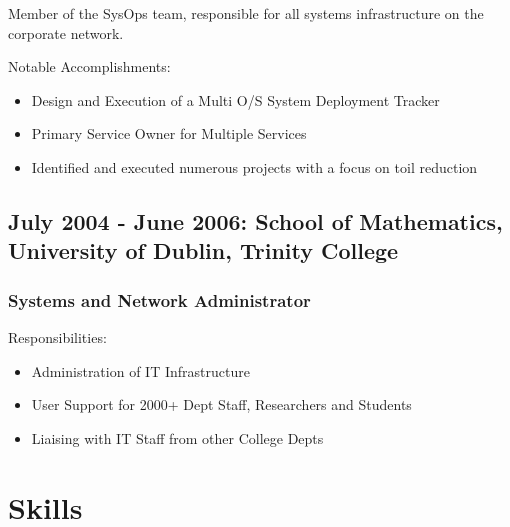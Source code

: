 \documentclass[a4paper, 10pt] {article}
\begin{document}
Member of the SysOps team, responsible for all systems infrastructure on the corporate network.

\vspace{5mm} %

Notable Accomplishments:

\begin{itemize}
  \item Design and Execution of a Multi O/S System Deployment Tracker
  \item Primary Service Owner for Multiple Services
  \item Identified and executed numerous projects with a focus on toil reduction
\end{itemize}

\subsection*{July 2004 - June 2006: School of Mathematics, University of Dublin, Trinity College}

\subsubsection*{Systems and Network Administrator}

Responsibilities:

\begin{itemize}
  \item Administration of IT Infrastructure
  \item User Support for 2000+ Dept Staff, Researchers and Students
  \item Liaising with IT Staff from other College Depts
\end{itemize}

\section*{Skills}
\end{document}
